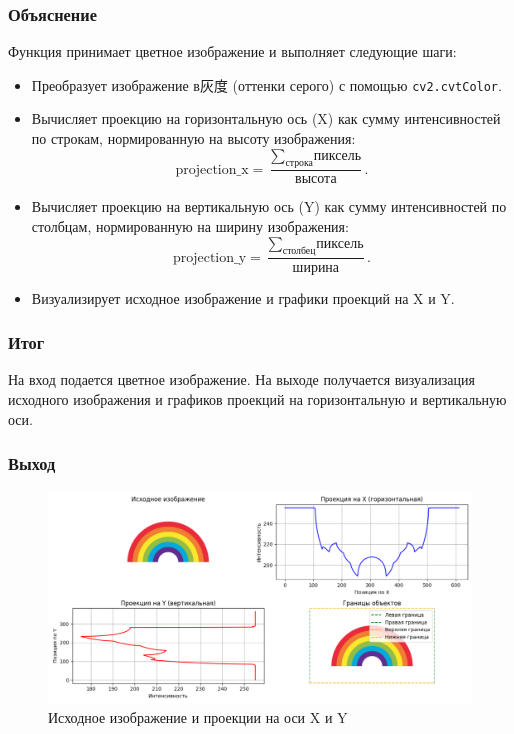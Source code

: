\documentclass[a4paper,12pt]{article}
\begin{document}
\subsubsection{Объяснение}
Функция принимает цветное изображение и выполняет следующие шаги:
\begin{itemize}
    \item Преобразует изображение в灰度 (оттенки серого) с помощью \texttt{cv2.cvtColor}.
    \item Вычисляет проекцию на горизонтальную ось (X) как сумму интенсивностей по строкам, нормированную на высоту изображения:
    \[
    \text{projection\_x} = \frac{\sum_{\text{строка}} \text{пиксель}}{\text{высота}}.
    \]
    \item Вычисляет проекцию на вертикальную ось (Y) как сумму интенсивностей по столбцам, нормированную на ширину изображения:
    \[
    \text{projection\_y} = \frac{\sum_{\text{столбец}} \text{пиксель}}{\text{ширина}}.
    \]
    \item Визуализирует исходное изображение и графики проекций на X и Y.
\end{itemize}

\subsubsection{Итог}
На вход подается цветное изображение. На выходе получается визуализация исходного изображения и графиков проекций на горизонтальную и вертикальную оси.

\subsubsection{Выход}

\begin{figure}[H]
    \centering
    \includegraphics[width=1\textwidth]{im/imПроекции.png}
    \caption{Исходное изображение и проекции на оси X и Y}
    \label{fig:projections}
\end{figure}
\end{document}
